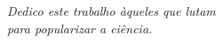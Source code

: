 \begin{dedicatoria}
    \vspace*{\fill}
    \flushright
    \noindent
    \textit{Dedico este trabalho àqueles que lutam \\ para popularizar a ciência.}
\end{dedicatoria}
